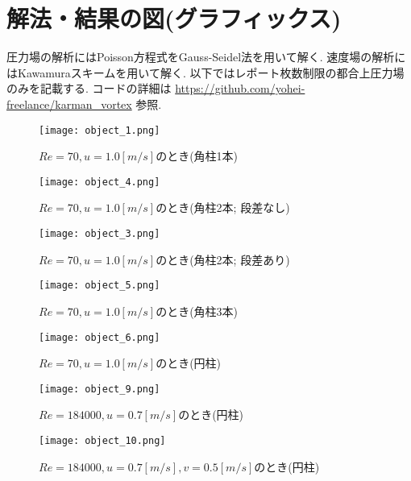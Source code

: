 \documentclass[12pt]{jsarticle}
\begin{document}
\section{解法・結果の図(グラフィックス)}
圧力場の解析にはPoisson方程式をGauss-Seidel法を用いて解く. 速度場の解析にはKawamuraスキームを用いて解く. 以下ではレポート枚数制限の都合上圧力場のみを記載する. コードの詳細は \url{https://github.com/yohei-freelance/karman_vortex} 参照.
\begin{figure}[htbp]
 \begin{minipage}{0.5\hsize}
  \begin{center}
   \texttt{[image: object\_1.png]}
   \caption{$Re=70, u=1.0[m/s]$のとき(角柱1本)}
  \end{center}
  \label{fig:one}
 \end{minipage}
 \begin{minipage}{0.5\hsize}
  \begin{center}
   \texttt{[image: object\_4.png]}
   \caption{$Re=70, u=1.0[m/s]$のとき(角柱2本; 段差なし)}   
  \end{center}
  \label{fig:two}
 \end{minipage}
\end{figure}
\begin{figure}[htbp]
 \begin{minipage}{0.5\hsize}
  \begin{center}
   \texttt{[image: object\_3.png]}
   \caption{$Re=70, u=1.0[m/s]$のとき(角柱2本; 段差あり)}
  \end{center}
  \label{fig:one}
 \end{minipage}
 \begin{minipage}{0.5\hsize}
  \begin{center}
   \texttt{[image: object\_5.png]}
   \caption{$Re=70, u=1.0[m/s]$のとき(角柱3本)}   
  \end{center}
  \label{fig:two}
 \end{minipage}
\end{figure}
\begin{figure}[htbp]
 \begin{minipage}{0.5\hsize}
  \begin{center}
   \texttt{[image: object\_6.png]}
   \caption{$Re=70, u=1.0[m/s]$のとき(円柱)}
  \end{center}
  \label{fig:one}
 \end{minipage}
 \begin{minipage}{0.5\hsize}
  \begin{center}
   \texttt{[image: object\_9.png]}
   \caption{$Re=184000, u=0.7[m/s]$のとき(円柱)}   
  \end{center}
  \label{fig:two}
 \end{minipage}
\end{figure}
\begin{figure}[htbp]
\begin{center}
\texttt{[image: object\_10.png]}
\caption{$Re=184000, u=0.7[m/s], v=0.5[m/s]$のとき(円柱)}
\end{center}
\end{figure}
 \newpage
\end{document}
